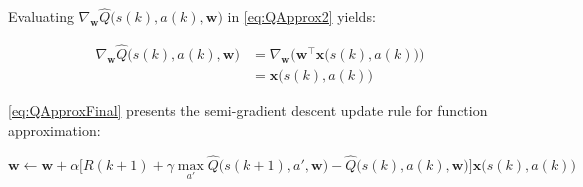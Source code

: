 Evaluating $ \nabla_{\textbf{w}}\hat{Q}\bigg(s(k),a(k),\textbf{w}\bigg) $ in \cref{eq:QApprox2} yields:

\begin{equation}\label{eq:NablaQApprox}
\begin{split}
		\nabla_{\textbf{w}}\hat{Q}\bigg(s(k),a(k),\textbf{w}\bigg) 
		&=\nabla_{\textbf{w}}\bigg(\textbf{w}^{\intercal}\textbf{x}\bigg(s(k),a(k)\bigg)\bigg)\\
	&=\textbf{x}\bigg(s(k),a(k)\bigg)
\end{split}
\end{equation}

\cref{eq:QApproxFinal} presents the semi-gradient descent update rule for function approximation: 

\begin{equation}\label{eq:QApproxFinal}
	\textbf{w} \leftarrow \textbf{w}
	+\alpha\bigg[R(k+1)+\gamma\max_{a'}\hat{Q}\bigg(s(k+1),a',\textbf{w}\bigg)
	-\hat{Q}\bigg(s(k),a(k),\textbf{w}\bigg)\bigg]\textbf{x}\bigg(s(k),a(k)\bigg)
\end{equation}

\newpage